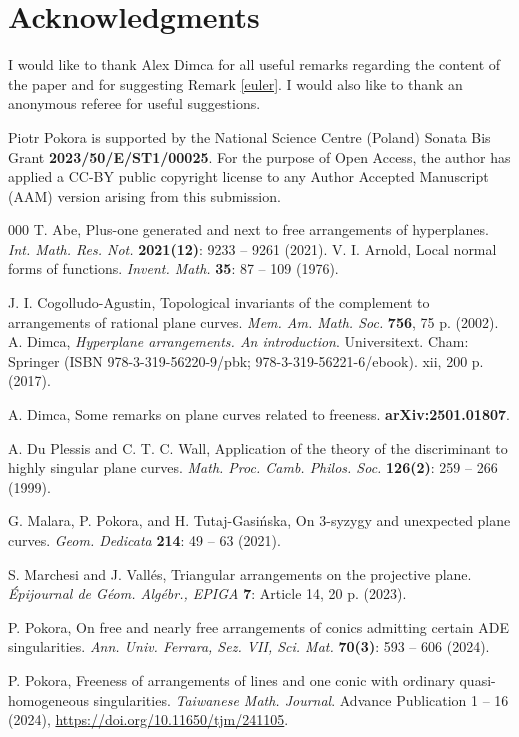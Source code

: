 \documentclass[12pt]{article}
\theoremstyle{plain}
\theoremstyle{definition}
\begin{document}
\section*{Acknowledgments}
I would like to thank Alex Dimca for all useful remarks regarding the content of the paper and for suggesting Remark \ref{euler}. I would also like to thank an anonymous referee for useful suggestions.

Piotr Pokora is supported by the National Science Centre (Poland) Sonata Bis Grant  \textbf{2023/50/E/ST1/00025}. For the purpose of Open Access, the author has applied a CC-BY public copyright license to any Author Accepted Manuscript (AAM) version arising from this submission.
\begin{thebibliography}{000}
T. Abe, Plus-one generated and next to free arrangements of hyperplanes. \textit{Int. Math. Res. Not.} \textbf{2021(12)}: 9233 -- 9261 (2021).
V. I. Arnold, Local normal forms of functions. \textit{Invent. Math.} \textbf{35}: 87 -- 109 (1976).

J. I. Cogolludo-Agustin, Topological invariants of the complement to arrangements of rational plane curves. \textit{Mem. Am. Math. Soc.} \textbf{756}, 75 p. (2002).
A. Dimca,  \textit{Hyperplane arrangements. An introduction}. Universitext. Cham: Springer (ISBN 978-3-319-56220-9/pbk; 978-3-319-56221-6/ebook). xii, 200 p. (2017).

A. Dimca, Some remarks on plane curves related to freeness. \textbf{arXiv:2501.01807}.

A. Du Plessis and C. T. C. Wall, Application of the theory of the discriminant to highly singular plane curves. \textit{Math. Proc. Camb. Philos. Soc.} \textbf{126(2)}: 259 -- 266 (1999).

G. Malara, P. Pokora, and H. Tutaj-Gasi\'nska, On $3$-syzygy and unexpected plane curves. \textit{Geom. Dedicata} \textbf{214}: 49 -- 63 (2021).

S. Marchesi and J. Vall\'es, Triangular arrangements on the projective plane. \textit{\'Epijournal de G\'eom. Alg\'ebr., EPIGA} \textbf{7}: Article 14, 20 p. (2023).

P. Pokora, On free and nearly free arrangements of conics admitting certain ADE singularities. \textit{Ann. Univ. Ferrara, Sez. VII, Sci. Mat.} \textbf{70(3)}: 593 -- 606 (2024).

P. Pokora, Freeness of arrangements of lines and one conic with ordinary quasi-homogeneous singularities. \textit{Taiwanese Math. Journal}. Advance Publication 1 -- 16 (2024), \url{https://doi.org/10.11650/tjm/241105}.


\end{thebibliography}
\end{document}
